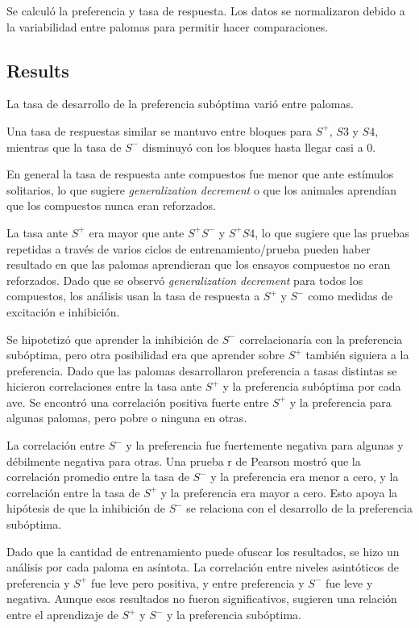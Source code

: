 \documentclass[a4paper,12pt]{article}
\begin{document}
Se calculó la preferencia y tasa de respuesta.
Los datos se normalizaron debido a la variabilidad entre palomas para permitir hacer comparaciones.

\subsection{Results}

La tasa de desarrollo de la preferencia subóptima varió entre palomas.

Una tasa de respuestas similar se mantuvo entre bloques para $S^{+}$, $S3$ y $S4$, mientras que la tasa de $S^{-}$ disminuyó con los bloques hasta llegar casi a 0.

En general la tasa de respuesta ante compuestos fue menor que ante estímulos solitarios, lo que sugiere {\itshape generalization decrement} o que los animales aprendían que los compuestos nunca eran reforzados.

La tasa ante $S^{+}$ era mayor que ante $S^{+}S^{-}$ y $S^{+}S4$, lo que sugiere que las pruebas repetidas a través de varios ciclos de entrenamiento/prueba pueden haber resultado en que las palomas aprendieran que los ensayos compuestos no eran reforzados.
Dado que se observó {\itshape generalization decrement} para todos los compuestos, los análisis usan la tasa de respuesta a $S^{+}$ y $S^{-}$ como medidas de excitación e inhibición.

Se hipotetizó que aprender la inhibición de $S^{-}$ correlacionaría con la preferencia subóptima, pero otra posibilidad era que aprender sobre $S^{+}$ también siguiera a la preferencia.
Dado que las palomas desarrollaron preferencia a tasas distintas se hicieron correlaciones entre la tasa ante $S^{+}$ y la preferencia subóptima por cada ave.
Se encontró una correlación positiva fuerte entre $S^{+}$ y la preferencia para algunas palomas, pero pobre o ninguna en otras.

La correlación entre $S^{-}$ y la preferencia fue fuertemente negativa para algunas y débilmente negativa para otras.
Una prueba r de Pearson mostró que la correlación promedio entre la tasa de $S^{-}$ y la preferencia era menor a cero, y la correlación entre la tasa de $S^{+}$ y la preferencia era mayor a cero.
Esto apoya la hipótesis de que la inhibición de $S^{-}$ se relaciona con el desarrollo de la preferencia subóptima.

Dado que la cantidad de entrenamiento puede ofuscar los resultados, se hizo un análisis por cada paloma en asíntota.
La correlación entre niveles asintóticos de preferencia y $S^{+}$ fue leve pero positiva, y entre preferencia y $S^{-}$ fue leve y negativa.
Aunque esos resultados no fueron significativos, sugieren una relación entre el aprendizaje de $S^{+}$ y $S^{-}$ y la preferencia subóptima.
\end{document}
